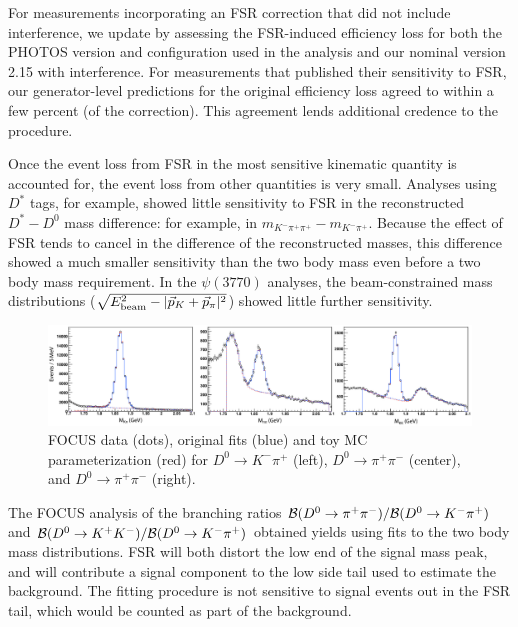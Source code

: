 For measurements incorporating an FSR correction that did not 
include interference, we update by assessing the FSR-induced 
efficiency loss for both the PHOTOS version and configuration 
used in the analysis and our nominal version 2.15 with interference.  
For measurements that published their sensitivity to FSR, our 
generator-level predictions for the original efficiency loss 
agreed to within a few percent (of the correction).  This agreement 
lends additional credence to the procedure.

Once the event loss from FSR in the most sensitive kinematic 
quantity is accounted for, the event loss from other quantities 
is very small.  Analyses using $D^*$ tags, for example, showed 
little sensitivity to FSR in the reconstructed $D^*-D^0$ mass 
difference: for example, in $m_{K^-\pi^+\pi^+}-m_{K^-\pi^+}$. 
Because the effect of FSR tends to cancel in the difference of 
the reconstructed masses, this difference showed a much smaller 
sensitivity than the two body mass even before a two body mass 
requirement. In the $\psi(3770)$ analyses, the beam-constrained 
mass distributions ($\sqrt{E_{\rm beam}^2 - |\vec{p}_K + \vec{p}_\pi|^2}$)  
showed little further sensitivity.

\begin{figure}
\begin{center}
\includegraphics[width=1.00\textwidth]{figures/charm/FocusFits.pdf}
\caption{FOCUS data (dots), original fits (blue) and 
toy MC parameterization (red) for $D^0\to K^-\pi^+$ (left), 
$D^0\to \pi^+\pi^-$ (center), and $D^0\to \pi^+\pi^-$ (right).}
\label{fig:FocusFits}
\end{center}
\end{figure}

The FOCUS \cite{Link:2002hi} analysis of the branching ratios 
${\cal B}(D^0\to \pi^+\pi^-)/{\cal B}(D^0\to K^-\pi^+)$ and 
${\cal B}(D^0\to K^+ K^-)/{\cal B}(D^0\to K^-\pi^+)$ obtained 
yields using fits to the two body mass distributions.  FSR will 
both distort the low end of the signal mass peak, and will 
contribute a signal component to the low side tail used to 
estimate the background.  The fitting procedure is not sensitive 
to signal events out in the FSR tail, which would be counted as 
part of the background.

